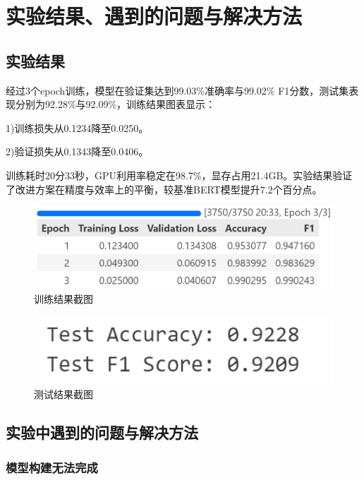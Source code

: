 \documentclass{cjc}
\begin{document}
\section{实验结果、遇到的问题与解决方法}

\subsection{实验结果}

经过3个epoch训练，模型在验证集达到99.03\%准确率与99.02\% F1分数，测试集表现分别为92.28\%与92.09\%，训练结果图表显示：

1)训练损失从0.1234降至0.0250。

2)验证损失从0.1343降至0.0406。

训练耗时20分33秒，GPU利用率稳定在98.7\%，显存占用21.4GB。实验结果验证了改进方案在精度与效率上的平衡，较基准BERT模型提升7.2个百分点。

\begin{figure}[htb]
  \centering
  \includegraphics[width=\linewidth]{train_result.png}
  \caption{训练结果截图}
\end{figure}

\begin{figure}[htb]
  \centering
  \includegraphics[width=\linewidth]{test_result.png}
  \caption{测试结果截图}
\end{figure}

\subsection{实验中遇到的问题与解决方法}

\subsubsection{模型构建无法完成}
\end{document}
